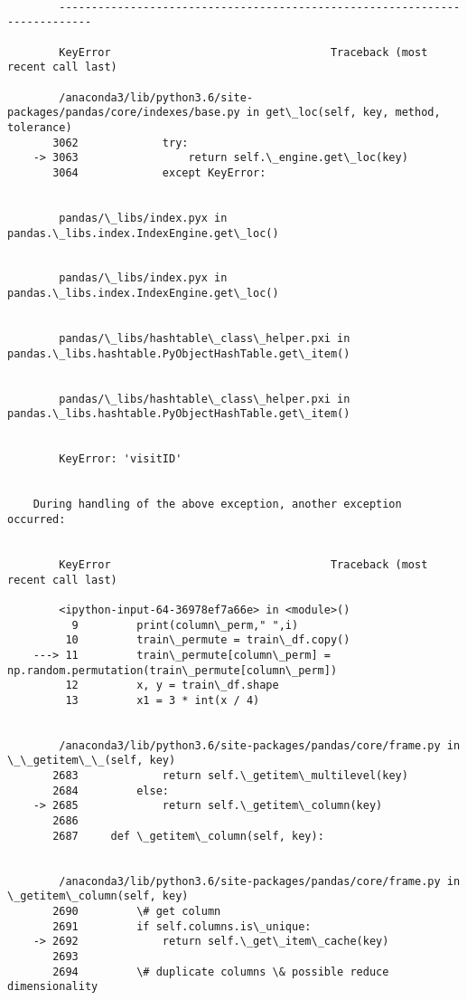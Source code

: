 \documentclass[11pt]{article}
\begin{document}
\begin{Verbatim}[commandchars=\\\{\}]
    \end{Verbatim}

    \begin{Verbatim}[commandchars=\\\{\}]

        ---------------------------------------------------------------------------

        KeyError                                  Traceback (most recent call last)

        /anaconda3/lib/python3.6/site-packages/pandas/core/indexes/base.py in get\_loc(self, key, method, tolerance)
       3062             try:
    -> 3063                 return self.\_engine.get\_loc(key)
       3064             except KeyError:


        pandas/\_libs/index.pyx in pandas.\_libs.index.IndexEngine.get\_loc()


        pandas/\_libs/index.pyx in pandas.\_libs.index.IndexEngine.get\_loc()


        pandas/\_libs/hashtable\_class\_helper.pxi in pandas.\_libs.hashtable.PyObjectHashTable.get\_item()


        pandas/\_libs/hashtable\_class\_helper.pxi in pandas.\_libs.hashtable.PyObjectHashTable.get\_item()


        KeyError: 'visitID'

        
    During handling of the above exception, another exception occurred:


        KeyError                                  Traceback (most recent call last)

        <ipython-input-64-36978ef7a66e> in <module>()
          9         print(column\_perm," ",i)
         10         train\_permute = train\_df.copy()
    ---> 11         train\_permute[column\_perm] = np.random.permutation(train\_permute[column\_perm])
         12         x, y = train\_df.shape
         13         x1 = 3 * int(x / 4)


        /anaconda3/lib/python3.6/site-packages/pandas/core/frame.py in \_\_getitem\_\_(self, key)
       2683             return self.\_getitem\_multilevel(key)
       2684         else:
    -> 2685             return self.\_getitem\_column(key)
       2686 
       2687     def \_getitem\_column(self, key):


        /anaconda3/lib/python3.6/site-packages/pandas/core/frame.py in \_getitem\_column(self, key)
       2690         \# get column
       2691         if self.columns.is\_unique:
    -> 2692             return self.\_get\_item\_cache(key)
       2693 
       2694         \# duplicate columns \& possible reduce dimensionality



\end{Verbatim}
\end{document}
